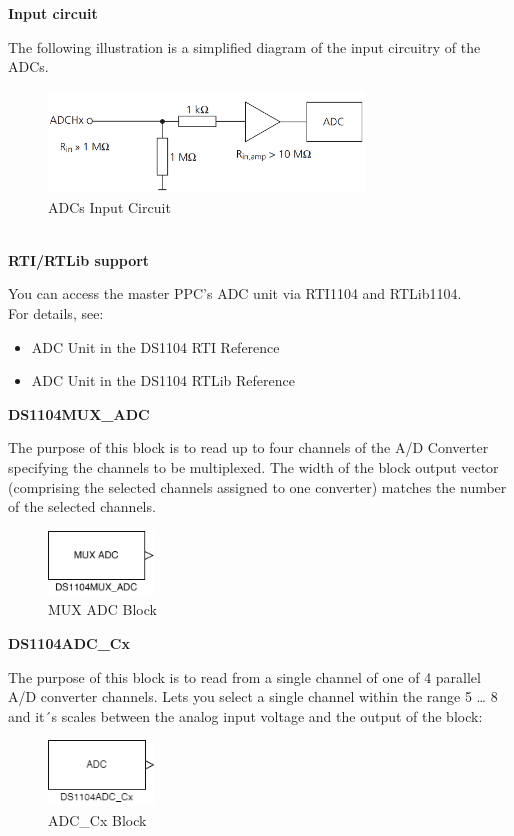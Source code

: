 \noindent \textbf{Input circuit}\par
The following illustration is a simplified diagram of the input circuitry of the ADCs.
\begin{figure}[H]
    \centering
    \includegraphics[width=0.75\textwidth]{Images/ADCs.png}
    \caption{ADCs Input Circuit}
    \label{ADCs}
\end{figure}
\ \\
\noindent \textbf{RTI/RTLib support}\par
You can access the master PPC’s ADC unit via RTI1104 and RTLib1104.\\
For details, see:
\begin{itemize}
    \item ADC Unit in the DS1104 RTI Reference
    \item ADC Unit in the DS1104 RTLib Reference
\end{itemize}

\noindent \textbf{DS1104MUX\_ADC}\par
The purpose of this block is to read up to four channels of the A/D Converter specifying the channels to be multiplexed. The width of the block output vector (comprising the selected channels assigned to one converter) matches the number of the selected channels.\par
\begin{figure}[H]
    \centering
    \includegraphics[width=0.25\textwidth]{Images/DS1104MUX_ADC.png}
    \caption{MUX ADC Block}
    \label{MUX ADC}
\end{figure}

\noindent \textbf{DS1104ADC\_Cx}\par
The purpose of this block is to read from a single channel of one of 4 parallel A/D converter channels. Lets you select a single channel within the range 5 … 8 and it´s scales between the analog input voltage and the output of the block:

\begin{figure}[H]
    \centering
    \includegraphics[width=0.25\textwidth]{Images/DS1104ADC_Cx.png}
    \caption{ADC\_Cx Block}
    \label{ADC_Cx}
\end{figure}

